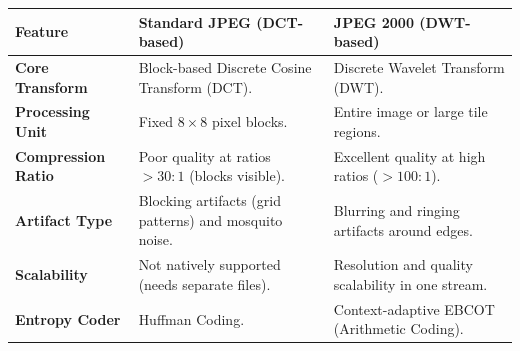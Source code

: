 \documentclass[12pt,a4paper]{article}
\renewcommand{\arraystretch}{1.45}
\begin{document}
\begin{tcolorbox}[tikzbox, title={\textbf{JPEG vs. JPEG 2000 Comparison Matrix}}]
\par\noindent
{\renewcommand{\arraystretch}{1.4}%
\begin{tabularx}{\linewidth}{|B{3.2cm}|Y|Y|}
\hline
\textbf{Feature} & \textbf{Standard JPEG (DCT-based)} & \textbf{JPEG 2000 (DWT-based)} \\
\hline
\textbf{Core Transform} & Block-based Discrete Cosine Transform (DCT). & Discrete Wavelet Transform (DWT). \\
\hline
\textbf{Processing Unit} & Fixed $8 \times 8$ pixel blocks. & Entire image or large tile regions. \\
\hline
\textbf{Compression Ratio} & Poor quality at ratios $> 30:1$ (blocks visible). & Excellent quality at high ratios ($> 100:1$). \\
\hline
\textbf{Artifact Type} & Blocking artifacts (grid patterns) and mosquito noise. & Blurring and ringing artifacts around edges. \\
\hline
\textbf{Scalability} & Not natively supported (needs separate files). & Resolution and quality scalability in one stream. \\
\hline
\textbf{Entropy Coder} & Huffman Coding. & Context-adaptive EBCOT (Arithmetic Coding). \\
\hline
\end{tabularx}}
\end{tcolorbox}
\end{document}
